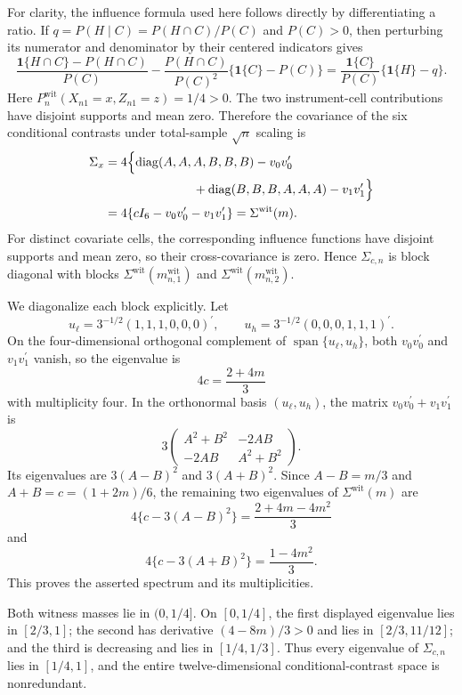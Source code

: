 For clarity, the influence formula used here follows directly by differentiating a ratio. If \(q=P(H\mid C)=P(H\cap C)/P(C)\) and \(P(C)>0\), then perturbing its numerator and denominator by their centered indicators gives
\[
\frac{\mathbf 1\{H\cap C\}-P(H\cap C)}{P(C)}
-\frac{P(H\cap C)}{P(C)^2}\{\mathbf 1\{C\}-P(C)\}
=\frac{\mathbf 1\{C\}}{P(C)}\{\mathbf 1\{H\}-q\}.
\]
Here \(P_n^{\mathrm{wit}}(X_{n1}=x,Z_{n1}=z)=1/4>0\). The two instrument-cell contributions have disjoint supports and mean zero. Therefore the covariance of the six conditional contrasts under total-sample \(\sqrt n\) scaling is
\[
\begin{aligned}
\Sigma_x
&=4\Bigl\{\operatorname{diag}(A,A,A,B,B,B)-v_0v_0^{\prime}\\
&\hspace{25mm}+\operatorname{diag}(B,B,B,A,A,A)-v_1v_1^{\prime}\Bigr\}\\
&=4\{cI_6-v_0v_0^{\prime}-v_1v_1^{\prime}\}
=\Sigma^{\mathrm{wit}}(m).
\end{aligned}
\]
For distinct covariate cells, the corresponding influence functions have disjoint supports and mean zero, so their cross-covariance is zero. Hence \(\Sigma_{c,n}\) is block diagonal with blocks \(\Sigma^{\mathrm{wit}}(m^{\mathrm{wit}}_{n,1})\) and \(\Sigma^{\mathrm{wit}}(m^{\mathrm{wit}}_{n,2})\).

We diagonalize each block explicitly. Let
\[
u_\ell=3^{-1/2}(1,1,1,0,0,0)^{\prime},
\qquad
u_h=3^{-1/2}(0,0,0,1,1,1)^{\prime}.
\]
On the four-dimensional orthogonal complement of \(\operatorname{span}\{u_\ell,u_h\}\), both \(v_0v_0^{\prime}\) and \(v_1v_1^{\prime}\) vanish, so the eigenvalue is
\[
4c=\frac{2+4m}{3}
\]
with multiplicity four. In the orthonormal basis \((u_\ell,u_h)\), the matrix \(v_0v_0^{\prime}+v_1v_1^{\prime}\) is
\[
3\begin{pmatrix}
A^2+B^2&-2AB\\
-2AB&A^2+B^2
\end{pmatrix}.
\]
Its eigenvalues are \(3(A-B)^2\) and \(3(A+B)^2\). Since \(A-B=m/3\) and \(A+B=c=(1+2m)/6\), the remaining two eigenvalues of \(\Sigma^{\mathrm{wit}}(m)\) are
\[
4\{c-3(A-B)^2\}=\frac{2+4m-4m^2}{3}
\]
and
\[
4\{c-3(A+B)^2\}=\frac{1-4m^2}{3}.
\]
This proves the asserted spectrum and its multiplicities.

Both witness masses lie in \((0,1/4]\). On \([0,1/4]\), the first displayed eigenvalue lies in \([2/3,1]\); the second has derivative \((4-8m)/3>0\) and lies in \([2/3,11/12]\); and the third is decreasing and lies in \([1/4,1/3]\). Thus every eigenvalue of \(\Sigma_{c,n}\) lies in \([1/4,1]\), and the entire twelve-dimensional conditional-contrast space is nonredundant.

